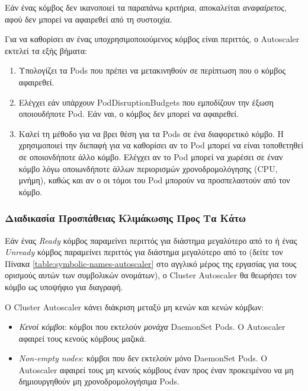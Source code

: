 Εάν ένας κόμβος δεν ικανοποιεί τα παραπάνω κριτήρια, αποκαλείται
\textit{αναφαίρετος}, αφού δεν μπορεί να αφαιρεθεί από τη συστοιχία.

Για να καθορίσει αν ένας υποχρησιμοποιούμενος κόμβος είναι περιττός, ο Autoscaler
εκτελεί τα εξής βήματα:
\begin{enumerate}
      \tightlist
      \item Υπολογίζει τα Pods που πρέπει να μετακινηθούν σε περίπτωση που ο
            κόμβος αφαιρεθεί.
      \item Ελέγχει εάν υπάρχουν PodDisruptionBudgets που εμποδίζουν την έξωση
            οποιουδήποτε Pod. Εάν ναι, ο κόμβος δεν μπορεί να αφαιρεθεί.
      \item Καλεί τη μέθοδο  για να βρει θέση για τα Pods σε
            ένα διαφορετικό κόμβο. Η  χρησιμοποιεί την
            διεπαφή  για να καθορίσει αν
            το Pod μπορεί να είναι τοποθετηθεί σε οποιονδήποτε άλλο κόμβο.
            Ελέγχει αν το Pod μπορεί να χωρέσει σε έναν κόμβο λόγω οποιωνδήποτε
            άλλων περιορισμών χρονοδρομολόγησης (CPU, μνήμη), καθώς και αν ο οι
            τόμοι του Pod μπορούν να προσπελαστούν από τον κόμβο.
\end{enumerate}

\subsubsection{Διαδικασία Προσπάθειας Κλιμάκωσης Προς Τα Κάτω}


Εάν ένας \textit{Ready} κόμβος παραμείνει περιττός για διάστημα μεγαλύτερο από
το  ή ένας \textit{Unready} κόμβος παραμείνει
περιττός για διάστημα μεγαλύτερο από το  (δείτε
τον Πίνακα \ref{table:symbolic-names-autoscaler} στο αγγλικό μέρος της εργασίας
για τους ορισμούς αυτών των συμβολικών ονομάτων), ο Cluster Autoscaler θα
θεωρήσει τον κόμβο ως υποψήφιο για διαγραφή.

Ο Cluster Autoscaler κάνει διάκριση μεταξύ μη κενών και κενών κόμβων:
\begin{itemize}
      \tightlist
      \item \textit{Κενοί κόμβοι}: κόμβοι που εκτελούν \textit{μονάχα} DaemonSet
            Pods. O Autoscaler αφαιρεί τους κενούς κόμβους μαζικά.
      \item \textit{Non-empty nodes}: κόμβοι που δεν εκτελούν μόνο DaemonSet
            Pods. O Autoscaler αφαιρεί τους μη κενούς κόμβους έναν προς έναν προκειμένου
            να μη δημιουργηθούν μη χρονοδρομολογήσιμα Pods.
\end{itemize}


